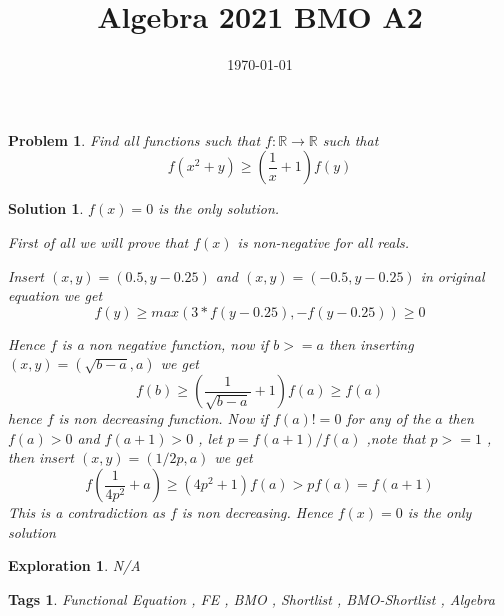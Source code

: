 \documentclass{article}
\title{Algebra 2021 BMO A2}
\date{\today}
\newtheorem*{problem}{Problem}
\newtheorem*{solution}{Solution}
\newtheorem*{exploration}{Exploration}
\newtheorem*{tags}{Tags}
\begin{document}
	
	\maketitle
	
	\begin{problem}
		Find all functions such that \(f: \mathbb{R} \to \mathbb{R}  \) such that \\ 
		\[f(x^{2} + y) \geq \left(\frac{1}{x} + 1 \right)f(y)\]
	\end{problem}
	
	\begin{solution}
		$f(x)=0$ is the only solution.
		
		First of all we will prove that $f(x)$ is non-negative for all reals.
		
		Insert $(x,y) = (0.5,y-0.25)$ and $(x,y) = (-0.5, y-0.25) $ in original equation we get \[f(y) \geq max(3*f(y-0.25),-f(y-0.25)) \geq 0\]
		
		
		Hence $f$ is a non negative function, now if $b>=a$ then inserting $(x,y)=(\sqrt{b-a},a)$ we get 
		\[f(b) \geq (\frac{1 }{\sqrt{b-a}}+1)f(a)  \geq f(a) \]
		hence $f$  is non decreasing function.
		Now if $f(a) !=0 $ for any of the $a$ then $f(a)>0$ and $f(a+1)>0$ , let $p = f(a+1)/f(a)$ ,note that $p>=1 $ , then insert $(x,y)=(1/2p,a) $ we get  
		\[f(\frac{1}{4p^2}+a) \geq (4p^2 + 1)f(a)  > pf(a) = f(a+1) \] 
		This is a contradiction as $ f$ is non decreasing. Hence $f(x)=0$ is the only solution
	\end{solution}
	
	\begin{exploration}
		N/A
	\end{exploration}
	
	\begin{tags}
	Functional Equation , FE , BMO , Shortlist , BMO-Shortlist , Algebra
	\end{tags}
	
\end{document}
